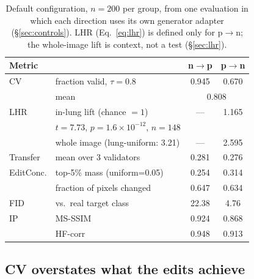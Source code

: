\begin{table}[t]
\centering
\caption{Default configuration, $n=200$ per group, from one evaluation in which each direction uses its own generator adapter (\S\ref{sec:controls}). LHR (Eq.~\ref{eq:lhr}) is defined only for p$\to$n; the whole-image lift is context, not a test (\S\ref{sec:lhr}).}
\label{tab:main-results}
\small
\begin{tabular}{@{}llcc@{}}
\toprule
Metric & & n$\to$p & p$\to$n \\
\midrule
CV & fraction valid, $\tau{=}0.8$ & 0.945 & 0.670 \\
& mean & \multicolumn{2}{c}{0.808} \\
LHR & in-lung lift (chance $=1$) & --- & 1.165 \\
& \multicolumn{3}{l}{\footnotesize $t=7.73$, $p=1.6\times10^{-12}$, $n=148$} \\
& whole image (lung-uniform: 3.21) & --- & 2.595 \\
Transfer & mean over 3 validators & 0.281 & 0.276 \\
EditConc. & top-5\% mass (uniform=0.05) & 0.254 & 0.314 \\
& fraction of pixels changed & 0.647 & 0.634 \\
FID & vs.\ real target class & 22.38 & 4.76 \\
IP & MS-SSIM & 0.924 & 0.868 \\
& HF-corr & 0.948 & 0.913 \\
\bottomrule
\end{tabular}
\end{table}

\subsection{CV overstates what the edits achieve}
\label{sec:cv-overstates}

